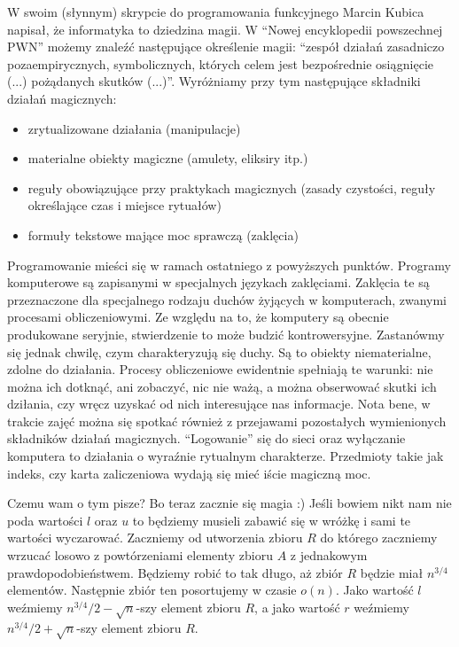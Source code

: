 W swoim (słynnym) skrypcie do programowania funkcyjnego Marcin Kubica napisał, że informatyka to dziedzina magii.
W ``Nowej encyklopedii powszechnej PWN'' możemy znaleźć następujące określenie magii: ``zespół działań zasadniczo pozaempirycznych, symbolicznych, których celem jest bezpośrednie osiągnięcie (...) pożądanych skutków (...)''.
Wyróżniamy przy tym następujące składniki działań magicznych:
\begin{itemize}
 \item zrytualizowane działania (manipulacje)
 \item materialne obiekty magiczne (amulety, eliksiry itp.)
 \item reguły obowiązujące przy praktykach magicznych (zasady czystości, reguły określające czas i miejsce rytuałów)
 \item formuły tekstowe mające moc sprawczą (zaklęcia)
\end{itemize}
Programowanie mieści się w ramach ostatniego z powyższych punktów.
Programy komputerowe są zapisanymi w specjalnych językach zaklęciami.
Zaklęcia te są przeznaczone dla specjalnego rodzaju duchów żyjących w komputerach, zwanymi procesami obliczeniowymi.
Ze względu na to, że komputery są obecnie produkowane seryjnie, stwierdzenie to może budzić kontrowersyjne.
Zastanówmy się jednak chwilę, czym charakteryzują się duchy.
Są to obiekty niematerialne, zdolne do działania.
Procesy obliczeniowe ewidentnie spełniają te warunki: nie można ich dotknąć, ani zobaczyć, nic nie ważą, a można obserwować skutki ich dziłania, czy wręcz uzyskać od nich interesujące nas informacje.
Nota bene, w trakcie zajęć można się spotkać również z przejawami pozostałych wymienionych składników działań magicznych.
``Logowanie'' się do sieci oraz wyłączanie komputera to działania o wyraźnie rytualnym charakterze.
Przedmioty takie jak indeks, czy karta zaliczeniowa wydają się mieć iście magiczną moc.

Czemu wam o tym pisze?
Bo teraz zacznie się magia :)
Jeśli bowiem nikt nam nie poda wartości $l$ oraz $u$ to będziemy musieli zabawić się w wróżkę i sami te wartości wyczarować.
Zaczniemy od utworzenia zbioru $R$ do którego zaczniemy wrzucać losowo z powtórzeniami elementy zbioru $A$ z jednakowym prawdopodobieństwem.
Będziemy robić to tak długo, aż zbiór $R$ będzie miał $n^{3/4}$ elementów.
Następnie zbiór ten posortujemy w czasie $o(n)$.
Jako wartość $l$ weźmiemy $n^{3/4}/2 - \sqrt{n}$-szy element zbioru $R$, a jako wartość $r$ weźmiemy $n^{3/4}/2 + \sqrt{n}$-szy element zbioru $R$.


